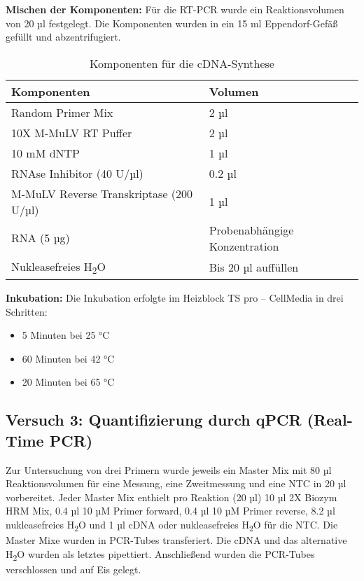 \documentclass{article}
\begin{document}
\textbf{Mischen der Komponenten:}
Für die RT-PCR wurde ein Reaktionsvolumen von 20 µl festgelegt. Die Komponenten wurden in ein 15 ml Eppendorf-Gefäß gefüllt und abzentrifugiert.

\begin{table}[H]
\centering
\begin{tabular}{|l|l|}
\hline
\textbf{Komponenten} & \textbf{Volumen} \\ \hline
Random Primer Mix & 2 µl \\ \hline
10X M-MuLV RT Puffer & 2 µl \\ \hline
10 mM dNTP & 1 µl \\ \hline
RNAse Inhibitor (40 U/µl) & 0.2 µl \\ \hline
M-MuLV Reverse Transkriptase (200 U/µl) & 1 µl \\ \hline
RNA (5 µg) & Probenabhängige Konzentration \\ \hline
Nukleasefreies H\textsubscript{2}O & Bis 20 µl auffüllen \\ \hline
\end{tabular}
\caption{Komponenten für die cDNA-Synthese}
\end{table}

\textbf{Inkubation:}
Die Inkubation erfolgte im Heizblock TS pro – CellMedia in drei Schritten:
\begin{itemize}
    \item 5 Minuten bei 25 °C
    \item 60 Minuten bei 42 °C
    \item 20 Minuten bei 65 °C
\end{itemize}

\subsection*{Versuch 3: Quantifizierung durch qPCR (Real-Time PCR)}

Zur Untersuchung von drei Primern wurde jeweils ein Master Mix mit 80 µl Reaktionsvolumen für eine Messung, eine Zweitmessung und eine NTC in 20 µl vorbereitet. Jeder Master Mix enthielt pro Reaktion (20 µl) 10 µl 2X Biozym HRM Mix, 0.4 µl 10 µM Primer forward, 0.4 µl 10 µM Primer reverse, 8.2 µl nukleasefreies H\textsubscript{2}O und 1 µl cDNA oder nukleasefreies H\textsubscript{2}O für die NTC. Die Master Mixe wurden in PCR-Tubes transferiert. Die cDNA und das alternative H\textsubscript{2}O wurden als letztes pipettiert. Anschließend wurden die PCR-Tubes verschlossen und auf Eis gelegt.
\end{document}
